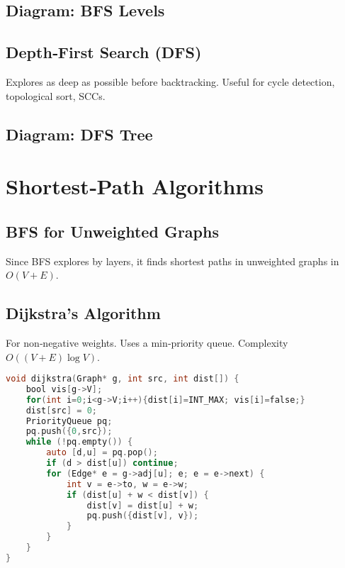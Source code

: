 \documentclass[12pt]{article}
\begin{document}
\subsection*{Diagram: BFS Levels}
\begin{center}
\end{center}

\subsection*{Depth‑First Search (DFS)}
Explores as deep as possible before backtracking. Useful for cycle detection, topological sort, SCCs.

\subsection*{Diagram: DFS Tree}
\begin{center}
\end{center}

\newpage
\section{Shortest‑Path Algorithms}
\subsection*{BFS for Unweighted Graphs}
Since BFS explores by layers, it finds shortest paths in unweighted graphs in \(O(V+E)\).

\subsection*{Dijkstra’s Algorithm}
For non‑negative weights. Uses a min‑priority queue. Complexity \(O((V+E)\log V)\).
\begin{lstlisting}[language=C]
void dijkstra(Graph* g, int src, int dist[]) {
    bool vis[g->V];
    for(int i=0;i<g->V;i++){dist[i]=INT_MAX; vis[i]=false;}
    dist[src] = 0;
    PriorityQueue pq;
    pq.push({0,src});
    while (!pq.empty()) {
        auto [d,u] = pq.pop();
        if (d > dist[u]) continue;
        for (Edge* e = g->adj[u]; e; e = e->next) {
            int v = e->to, w = e->w;
            if (dist[u] + w < dist[v]) {
                dist[v] = dist[u] + w;
                pq.push({dist[v], v});
            }
        }
    }
}
\end{lstlisting}
\end{document}
